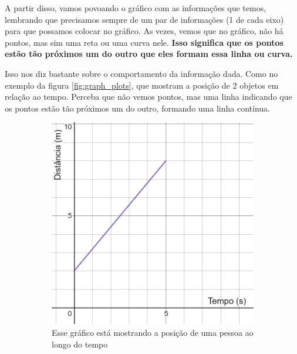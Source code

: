 \documentclass[12pt]{extarticle}
\newcommand{\<}{\langle}
\renewcommand{\>}{\rangle}
\theoremstyle{definition}
\begin{document}
A partir disso, vamos povoando o gráfico com as informações que temos, lembrando que precisamos sempre de um par de informações (1 de cada eixo) para que possamos colocar no gráfico. As vezes, vemos que no gráfico, não há pontos, mas sim uma reta ou uma curva nele. \textbf{Isso significa que os pontos estão tão próximos um do outro que eles formam essa linha ou curva.}

Isso nos diz bastante sobre o comportamento da informação dada. Como no exemplo da figura \ref{fig:graph_plots}, que mostram a posição de 2 objetos em relação ao tempo. Perceba que não vemos pontos, mas uma linha indicando que os pontos estão tão próximos um do outro, formando uma linha contínua.
\begin{figure}[H]
    \centering
    \begin{subfigure}[b]{0.4\textwidth}
         \centering
         \includegraphics[width=\textwidth]{line.png}
         \caption{Esse gráfico está mostrando a posição de uma pessoa ao longo do tempo}
         \label{fig:line}
     \end{subfigure}
     \hfill
     \begin{subfigure}[b]{0.4\textwidth}
         \centering

\end{subfigure}
\end{figure}
\end{document}
